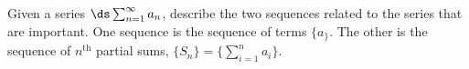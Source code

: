 {Given a series $\ds \sum_{n=1}^\infty a_n$, describe the two sequences related to the series that are important.
}
{One sequence is the sequence of terms $\{a_\}$. The other is the sequence of $n^\text{th}$ partial sums, $\{S_n\} = \{\sum_{i=1}^n a_i\}$.
}